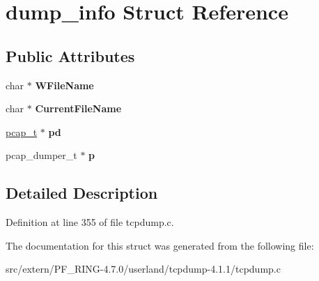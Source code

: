 \hypertarget{structdump__info}{
\section{dump\_\-info Struct Reference}
\label{structdump__info}
}
\subsection*{Public Attributes}
\begin{DoxyCompactItemize}
\item 
\hypertarget{structdump__info_adce358e659d28e7c9f3a3a0ac16f11b7}{
char $\ast$ {\bfseries WFileName}}
\label{structdump__info_adce358e659d28e7c9f3a3a0ac16f11b7}

\item 
\hypertarget{structdump__info_a80e790541eba06a6848a7dbd5fc2e837}{
char $\ast$ {\bfseries CurrentFileName}}
\label{structdump__info_a80e790541eba06a6848a7dbd5fc2e837}

\item 
\hypertarget{structdump__info_a6f0d8b5898e54c22f0ef6643401cfebf}{
\hyperlink{structpcap}{pcap\_\-t} $\ast$ {\bfseries pd}}
\label{structdump__info_a6f0d8b5898e54c22f0ef6643401cfebf}

\item 
\hypertarget{structdump__info_a6977d274646b9dbe9f49d1b9ded73b85}{
pcap\_\-dumper\_\-t $\ast$ {\bfseries p}}
\label{structdump__info_a6977d274646b9dbe9f49d1b9ded73b85}

\end{DoxyCompactItemize}


\subsection{Detailed Description}


Definition at line 355 of file tcpdump.c.



The documentation for this struct was generated from the following file:\begin{DoxyCompactItemize}
\item 
src/extern/PF\_\-RING-\/4.7.0/userland/tcpdump-\/4.1.1/tcpdump.c\end{DoxyCompactItemize}
